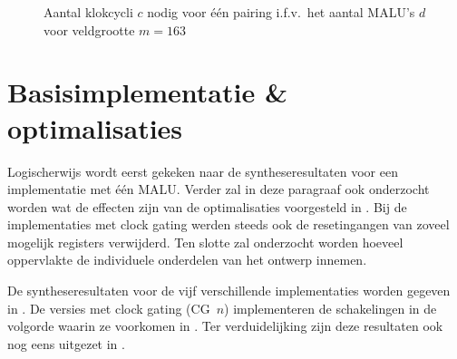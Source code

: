 \begin{figure}[h]
	\centering
		\caption{Aantal klokcycli $c$ nodig voor \'e\'en pairing i.f.v.\ het aantal MALU's $d$ voor veldgrootte $m = 163$\label{figuur-resultaten-multi-cycles}}
\end{figure}

\section{Basisimplementatie \& optimalisaties\label{section-resultaten-basisimplementatie}}

Logischerwijs wordt eerst gekeken naar de syntheseresultaten voor een implementatie met \'e\'en MALU. Verder zal in deze paragraaf ook onderzocht worden wat de effecten zijn van de optimalisaties voorgesteld in . Bij de implementaties met clock gating werden steeds ook de resetingangen van zoveel mogelijk registers verwijderd. Ten slotte zal onderzocht worden hoeveel oppervlakte de individuele onderdelen van het ontwerp innemen.

De syntheseresultaten voor de vijf verschillende implementaties worden gegeven in . De versies met clock gating (CG~$n$) implementeren de schakelingen in de volgorde waarin ze voorkomen in . Ter verduidelijking zijn deze resultaten ook nog eens uitgezet in .


